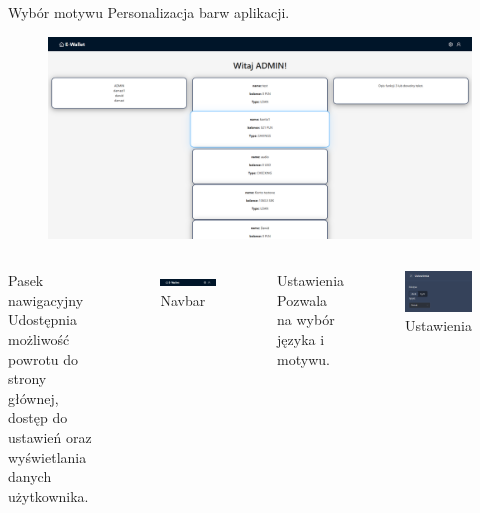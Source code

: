 \begin{frame}{\insertsection}
	\begin{block}{Wybór motywu}
		Personalizacja barw aplikacji.
	\end{block}
		\begin{figure}
		\centering
		\includegraphics[width=0.9\linewidth]{../images/MotywJasny}
	\end{figure}
\end{frame}

\begin{frame}{\insertsection}
	\begin{columns}
		\begin{block}{Pasek nawigacyjny}
			Udostępnia możliwość powrotu do strony głównej, dostęp do ustawień oraz wyświetlania danych użytkownika.
		\end{block}
		\begin{figure}
			\centering
			\includegraphics[width=0.7\linewidth]{../images/Navbar}
			\caption{Navbar}
			\label{fig:navbar}
		\end{figure}
		\begin{block}{Ustawienia}
			Pozwala na wybór języka i motywu.
		\end{block}
		\begin{figure}
			\centering
			\includegraphics[width=0.7\linewidth]{../images/Ustawienia}
			\caption{Ustawienia}
			\label{fig:ustawienia}
		\end{figure}	
	\end{columns}
\end{frame}

